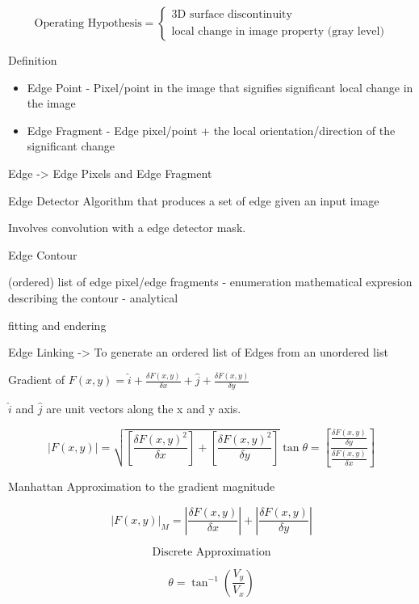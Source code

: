 \documentclass[11pt]{article}
\theoremstyle{definition}
\begin{document}
\[
\text{Operating Hypothesis} = \begin{cases}
    \text{3D surface discontinuity} \\
    \text{local change in image property (gray level)}
\end{cases}
\]

Definition

\begin{itemize}
    \item Edge Point - Pixel/point in the image that signifies significant local change in the image
    \item  Edge Fragment - Edge pixel/point + the local orientation/direction of the significant change
\end{itemize}

Edge -> Edge Pixels and Edge Fragment

Edge Detector 
Algorithm that produces a set of edge given an input image

Involves convolution with a edge detector mask.

Edge Contour 

(ordered) list of edge pixel/edge fragments - enumeration 
mathematical expresion describing the contour - analytical

fitting and endering 

Edge Linking -> To generate an ordered list of Edges from an unordered list


\newpage
\pagestyle{fancy}  %

Gradient of $F(x,y) = \hat{i} + \frac{\delta F(x,y)}{\delta x} + \hat{j} + \frac{\delta F(x,y)}{\delta y}$

$\hat{i}$ and $\hat{j}$ are unit vectors along the x and y axis.

\begin{equation}
    \vert F(x,y)\vert = \sqrt{[\frac{\delta F(x,y)^2}{\delta x}]+[\frac{\delta F(x,y)^2}{\delta y}]}
    \tan \theta = [\frac{\frac{\delta F(x,y)}{\delta y}}{\frac{\delta F(x,y)}{\delta x}}]
\end{equation}

Manhattan Approximation to the gradient magnitude

\[
\left| F(x, y) \right|_{M}
=
\left| \frac{\delta F(x,y)}{\delta x} \right|
+
\left| \frac{\delta F(x,y)}{\delta y} \right|
\]

\[
\text{Discrete Approximation}
\]

\[
\theta = \tan^{-1}\!\left(\frac{V_y}{V_x}\right)
\]
\end{document}
